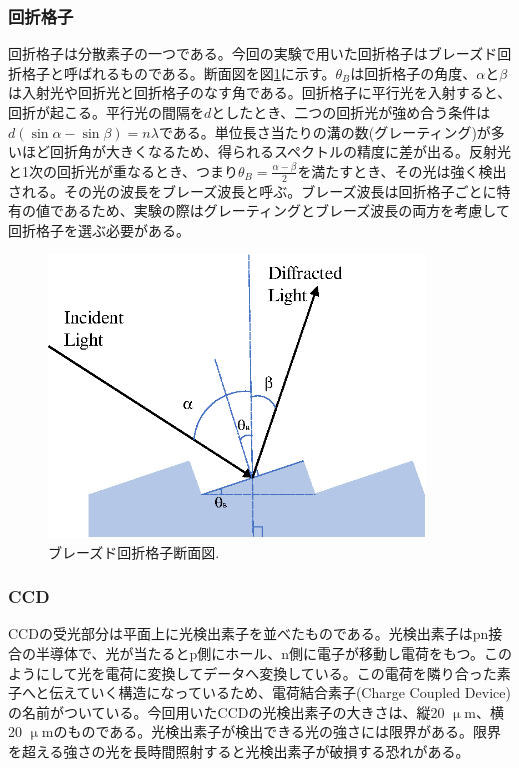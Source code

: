 \documentclass[11pt,a4j]{jsarticle}
\begin{document}
\newpage
\subsubsection{回折格子}
回折格子は分散素子の一つである。今回の実験で用いた回折格子はブレーズド回折格子と呼ばれるものである。断面図を図\ref{fig_grating1}に示す\cite{Grating}。$\theta_{B}$は回折格子の角度、$\alpha$と$\beta$は入射光や回折光と回折格子のなす角である。回折格子に平行光を入射すると、回折が起こる。平行光の間隔を$d$としたとき、二つの回折光が強め合う条件は$d(\sin\alpha-\sin\beta)=n\lambda$である。単位長さ当たりの溝の数(グレーティング)が多いほど回折角が大きくなるため、得られるスペクトルの精度に差が出る。反射光と1次の回折光が重なるとき、つまり$\theta_{B}=\frac{\alpha-\beta}{2}$を満たすとき、その光は強く検出される。その光の波長をブレーズ波長と呼ぶ。ブレーズ波長は回折格子ごとに特有の値であるため、実験の際はグレーティングとブレーズ波長の両方を考慮して回折格子を選ぶ必要がある。

\begin{figure}[h]
 \centering
 \includegraphics[clip,width=10cm]{grating.eps}
 \caption{ブレーズド回折格子断面図.}
 \label{fig_grating1}
\end{figure}

\subsubsection{CCD}
CCDの受光部分は平面上に光検出素子を並べたものである。光検出素子はpn接合の半導体で、光が当たるとp側にホール、n側に電子が移動し電荷をもつ。このようにして光を電荷に変換してデータへ変換している。この電荷を隣り合った素子へと伝えていく構造になっているため、電荷結合素子(Charge Coupled Device)の名前がついている\cite{CCD}。今回用いたCCDの光検出素子の大きさは、縦20 $\upmu$m、横20 $\upmu$mのものである。光検出素子が検出できる光の強さには限界がある。限界を超える強さの光を長時間照射すると光検出素子が破損する恐れがある。%
\end{document}
